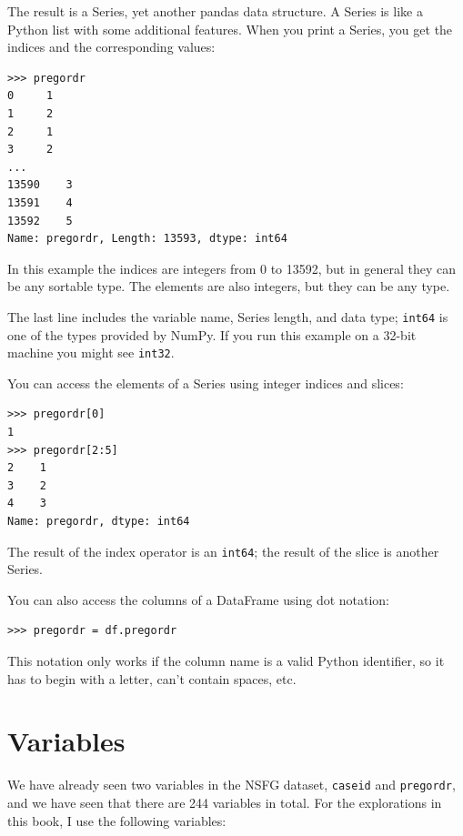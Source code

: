\documentclass[12pt]{book}
\theoremstyle{exercise}
\begin{document}
The result is a Series, yet another pandas data structure.
A Series is like a Python list with some additional features.
When you print a Series, you get the indices and the
corresponding values:%

\begin{verbatim}
>>> pregordr
0     1
1     2
2     1
3     2
...
13590    3
13591    4
13592    5
Name: pregordr, Length: 13593, dtype: int64
\end{verbatim}

In this example the indices are integers from 0 to 13592, but in
general they can be any sortable type.  The elements
are also integers, but they can be any type.

The last line includes the variable name, Series length, and data type;
{\tt int64} is one of the types provided by NumPy.  If you run
this example on a 32-bit machine you might see {\tt int32}.%

You can access the elements of a Series using integer indices
and slices:

\begin{verbatim}
>>> pregordr[0]
1
>>> pregordr[2:5]
2    1
3    2
4    3
Name: pregordr, dtype: int64
\end{verbatim}

The result of the index operator is an {\tt int64}; the
result of the slice is another Series.

You can also access the columns of a DataFrame using dot notation:%

\begin{verbatim}
>>> pregordr = df.pregordr
\end{verbatim}

This notation only works if the column name is a valid Python
identifier, so it has to begin with a letter, can't contain spaces, etc.


\section{Variables}

We have already seen two variables in the NSFG dataset, {\tt caseid}
and {\tt pregordr}, and we have seen that there are 244 variables in
total.  For the explorations in this book, I use the following
variables:
\end{document}
